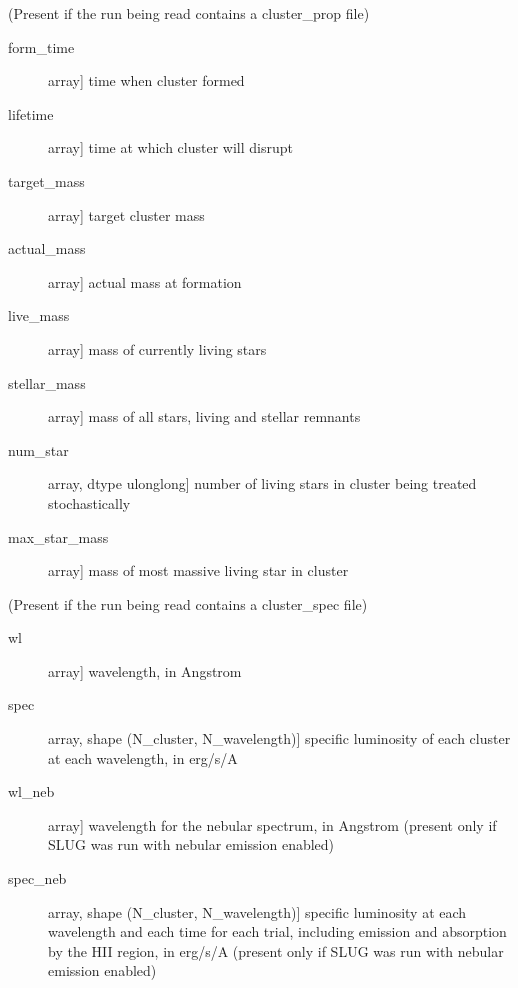 \documentclass[letterpaper,10pt,english]{sphinxmanual}
\begin{document}
\begin{fulllineitems}
\begin{description}
\begin{description}
\end{description}

(Present if the run being read contains a cluster\_prop file)
\begin{description}
\item[{form\_time}] \leavevmode{[}array{]}
time when cluster formed

\item[{lifetime}] \leavevmode{[}array{]}
time at which cluster will disrupt

\item[{target\_mass}] \leavevmode{[}array{]}
target cluster mass

\item[{actual\_mass}] \leavevmode{[}array{]}
actual mass at formation

\item[{live\_mass}] \leavevmode{[}array{]}
mass of currently living stars

\item[{stellar\_mass}] \leavevmode{[}array{]}
mass of all stars, living and stellar remnants

\item[{num\_star}] \leavevmode{[}array, dtype ulonglong{]}
number of living stars in cluster being treated stochastically

\item[{max\_star\_mass}] \leavevmode{[}array{]}
mass of most massive living star in cluster

\end{description}

(Present if the run being read contains a cluster\_spec file)
\begin{description}
\item[{wl}] \leavevmode{[}array{]}
wavelength, in Angstrom

\item[{spec}] \leavevmode{[}array, shape (N\_cluster, N\_wavelength){]}
specific luminosity of each cluster at each wavelength, in erg/s/A

\item[{wl\_neb}] \leavevmode{[}array{]}
wavelength for the nebular spectrum, in Angstrom (present
only if SLUG was run with nebular emission enabled)

\item[{spec\_neb}] \leavevmode{[}array, shape (N\_cluster, N\_wavelength){]}
specific luminosity at each wavelength and each time for each
trial, including emission and absorption by the HII region,
in erg/s/A (present only if SLUG was run with nebular
emission enabled)


\end{description}
\end{description}
\end{fulllineitems}
\end{document}
